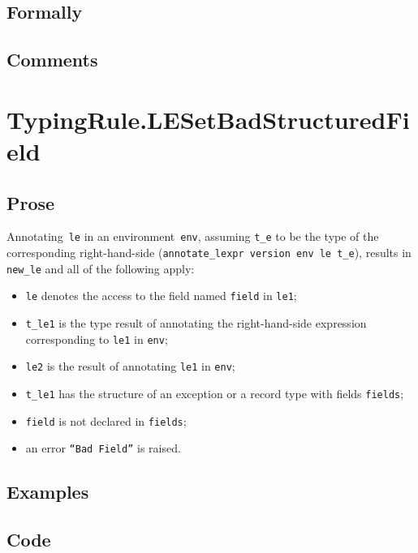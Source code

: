 \documentclass{book}
\begin{document}
  \subsection{Formally}

  \subsection{Comments}

\section{TypingRule.LESetBadStructuredField \label{sec:TypingRule.LESetBadStructuredField}}

  \subsection{Prose}
   Annotating~\texttt{le} in an environment~\texttt{env}, assuming
\texttt{t\_e} to be the type of the corresponding right-hand-side
(\texttt{annotate\_lexpr version env le t\_e}), results in \texttt{new\_le} and
all of the following apply:
   \begin{itemize}
   \item \texttt{le} denotes the access to the field named \texttt{field} in \texttt{le1};
   \item \texttt{t\_le1} is the type result of annotating the right-hand-side expression corresponding to \texttt{le1} in \texttt{env};
   \item \texttt{le2} is the result of annotating \texttt{le1} in \texttt{env};
   \item \texttt{t\_le1} has the structure of an exception or a record type with fields \texttt{fields};
   \item \texttt{field} is not declared in \texttt{fields};
   \item an error \texttt{``Bad Field''} is raised.
   \end{itemize}

  \subsection{Examples}

  \subsection{Code}
\end{document}
